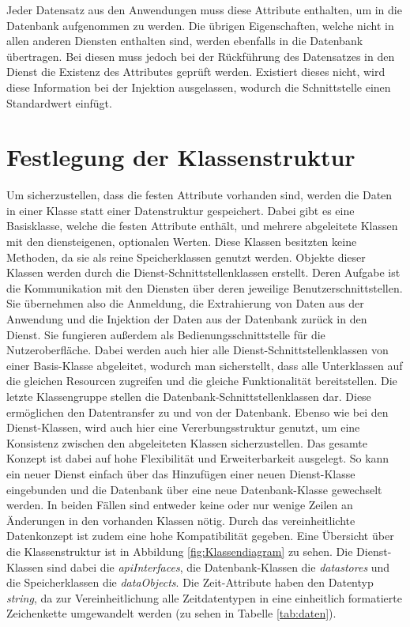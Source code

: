 Jeder Datensatz aus den Anwendungen muss diese Attribute enthalten, um in die Datenbank aufgenommen zu werden. Die übrigen Eigenschaften, welche nicht in allen anderen Diensten enthalten sind, werden ebenfalls in die Datenbank übertragen. Bei diesen muss jedoch bei der Rückführung des Datensatzes in den Dienst die Existenz des Attributes geprüft werden. Existiert dieses nicht, wird diese Information bei der Injektion ausgelassen, wodurch die Schnittstelle einen Standardwert einfügt.

\section{Festlegung der Klassenstruktur}

Um sicherzustellen, dass die festen Attribute vorhanden sind, werden die Daten in einer Klasse statt einer Datenstruktur gespeichert. Dabei gibt es eine Basisklasse, welche die festen Attribute enthält, und mehrere abgeleitete Klassen mit den diensteigenen, optionalen Werten. Diese Klassen besitzten keine Methoden, da sie als reine Speicherklassen genutzt werden. Objekte dieser Klassen werden durch die Dienst-Schnittstellenklassen erstellt. Deren Aufgabe ist die Kommunikation mit den Diensten über deren jeweilige Benutzerschnittstellen. Sie übernehmen also die Anmeldung, die Extrahierung von Daten aus der Anwendung und die Injektion der Daten aus der Datenbank zurück in den Dienst. Sie fungieren außerdem als Bedienungsschnittstelle für die Nutzeroberfläche. Dabei werden auch hier alle Dienst-Schnittstellenklassen von einer Basis-Klasse abgeleitet, wodurch man sicherstellt, dass alle Unterklassen auf die gleichen Resourcen zugreifen und die gleiche Funktionalität bereitstellen. Die letzte Klassengruppe stellen die Datenbank-Schnittstellenklassen dar. Diese ermöglichen den Datentransfer zu und von der Datenbank. Ebenso wie bei den Dienst-Klassen, wird auch hier eine Vererbungsstruktur genutzt, um eine Konsistenz zwischen den abgeleiteten Klassen sicherzustellen. Das gesamte Konzept ist dabei auf hohe Flexibilität und Erweiterbarkeit ausgelegt. So kann ein neuer Dienst einfach über das Hinzufügen einer neuen Dienst-Klasse eingebunden und die Datenbank über eine neue Datenbank-Klasse gewechselt werden. In beiden Fällen sind entweder keine oder nur wenige Zeilen an Änderungen in den vorhanden Klassen nötig. Durch das vereinheitlichte Datenkonzept ist zudem eine hohe Kompatibilität gegeben. Eine Übersicht über die Klassenstruktur ist in Abbildung \ref{fig:Klassendiagram} zu sehen. Die Dienst-Klassen sind dabei die \textit{apiInterfaces}, die Datenbank-Klassen die \textit{datastores} und die Speicherklassen die \textit{dataObjects}. Die Zeit-Attribute haben den Datentyp \textit{string}, da zur Vereinheitlichung alle Zeitdatentypen in eine einheitlich formatierte Zeichenkette umgewandelt werden (zu sehen in Tabelle \ref{tab:daten}).\\

